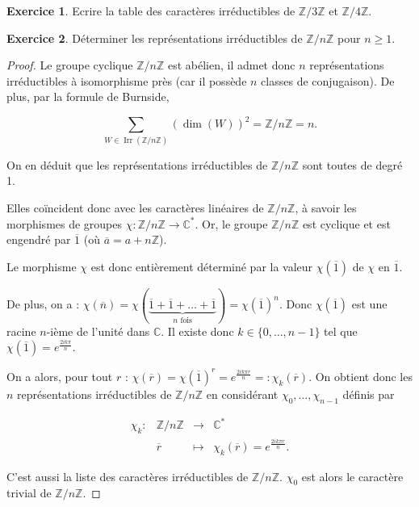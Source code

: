 \documentclass[french]{book}
\theoremstyle{definition}
\newtheorem{exo}{Exercice}
\begin{document}
\begin{exo}
  Ecrire la table des caractères irréductibles de \(\mathbb{Z}/{ 3 }\mathbb{Z}\) et \(\mathbb{Z}/{ 4 }\mathbb{Z}\).
\end{exo}

\begin{exo}
  Déterminer les représentations irréductibles de \(\mathbb{Z}/{n}\mathbb{Z}\) pour \(n \geq 1\).
\end{exo}

\begin{proof}
  Le groupe cyclique \(\mathbb{Z}/{ n }\mathbb{Z}\) est abélien, il admet donc \(n\) représentations irréductibles à isomorphisme près (car il possède \(n\) classes de conjugaison). De plus, par la formule de Burnside,

  \[\sum_{W \in \operatorname{Irr}(\mathbb{Z}/{ n }\mathbb{Z})} (\operatorname{dim}(W)) ^2 = \mathbb{Z}/{ n }\mathbb{Z} = n.\]

  On en déduit que les représentations irréductibles de \(\mathbb{Z}/{ n }\mathbb{Z}\) sont toutes de degré 1.

  Elles co\"incident donc avec les caractères linéaires de \(\mathbb{Z}/{n}\mathbb{Z}\), à savoir les morphismes de groupes \(\chi : \mathbb{Z}/{ n }\mathbb{Z} \longrightarrow \mathbb{C} ^{*}\). Or, le groupe \(\mathbb{Z}/{n}\mathbb{Z}\) est cyclique et est engendré par \(\overline{1}\) (où \(\overline{a} = a + n \mathbb{Z}\)).

  Le morphisme \(\chi\) est donc entièrement déterminé par la valeur \(\chi(\overline{1})\) de \(\chi\) en \(\overline{1}\).

  De plus, on a : \(\chi(\overline{n}) = \chi(\underbrace{\overline{1} + \overline{1} + \dots + \overline{1}}_{n \text{ fois}}) = \chi(\overline{1})^{n}\). Donc \(\chi(\overline{1})\) est une racine \(n\)-ième de l'unité dans \(\mathbb{C}\). Il existe donc \(k \in \{ 0, \dots, n-1 \} \) tel que \(\chi(\overline{1}) = e^{\frac{2 i k \pi}{n}}\).

  On a alors, pour tout \(r\) : \(\chi(\overline{r}) = \chi(\overline{1}) ^{r} = e^{\frac{2 i k \pi r}{n}}=: \chi_k(\overline{r})\). On obtient donc les \(n\) représentations irréductibles de \(\mathbb{Z}/{n}\mathbb{Z}\) en considérant \(\chi_0, \dots, \chi _{n-1}\) définis par

  \[\begin{matrix}
  \chi_k : & \mathbb{Z}/{n}\mathbb{Z} & \longrightarrow & \mathbb{C}^{*} \\
  \ & \overline{r}  & \longmapsto & \chi_k(\overline{r}) = e^{\frac{2 i k \pi r}{n}}.
  \end{matrix}\]

  C'est aussi la liste des caractères irréductibles de \(\mathbb{Z}/{n}\mathbb{Z}\). \(\chi_0\) est alors le caractère trivial de \(\mathbb{Z}/{n}\mathbb{Z}\).
\end{proof}
\end{document}
